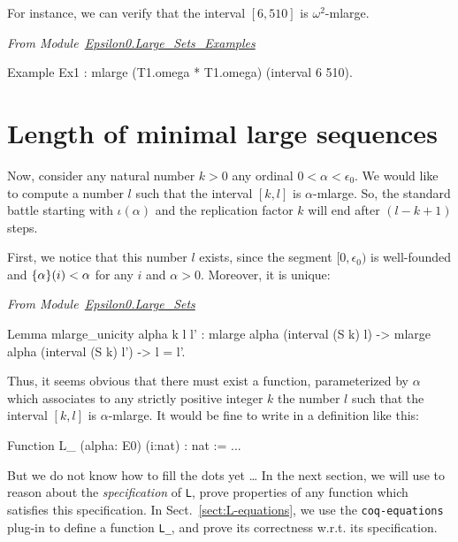 For instance, we can verify that the interval $[6,510]$ is $\omega^2$-mlarge.

\vspace{4pt}
 \noindent
\emph{From Module~\href{../theories/html/hydras.Epsilon0.Large_Sets_Examples.html}{Epsilon0.Large\_Sets\_Examples}}
\begin{Coqsrc}
Example Ex1 : mlarge (T1.omega * T1.omega) (interval 6 510).
\end{Coqsrc}


\section{Length of minimal large sequences}

Now, consider any natural number $k>0$ any ordinal $0<\alpha<\epsilon_0$.  We would like to compute
a number $l$ such that the interval $[k,l]$ is $\alpha$-mlarge. So, 
the standard battle starting with $\iota(\alpha)$ and the replication factor $k$ will end after $(l-k+1)$ steps.



First, we notice that this  number $l$ exists, since the segment $[0,\epsilon_0)$ is well-founded and $\mbox{$\{\alpha\}(i)$}<\alpha$ for any $i$ and $\alpha>0$.
Moreover, it is unique:

\vspace{4pt}
\noindent
\emph{From Module~\href{../theories/html/hydras.Epsilon0.Large_Sets.html}{Epsilon0.Large\_Sets}}
\begin{Coqsrc}
Lemma mlarge_unicity alpha k l l' : 
  mlarge alpha (interval (S k) l) ->
  mlarge alpha (interval (S k) l') ->
  l = l'.
\end{Coqsrc}

Thus, it seems obvious that there must exist a function, parameterized by $\alpha$ which associates to any  strictly positive integer $k$ the number $l$ such that
the interval $[k,l]$ is $\alpha$-mlarge. It would be fine to write in \gallina{} a definition like this:

\begin{Coqbad}
Function L_ (alpha: E0) (i:nat) :  nat := ...
\end{Coqbad}

But we do not know how to fill the dots yet \dots{}   In the next section, we will 
use \coq{} to reason  about the \emph{specification} of \texttt{L},
prove properties of any function which satisfies this specification.
In Sect.~\ref{sect:L-equations}, we use the \texttt{coq-equations} plug-in
to define a function \texttt{L\_}, and prove its correctness w.r.t. its specification.


